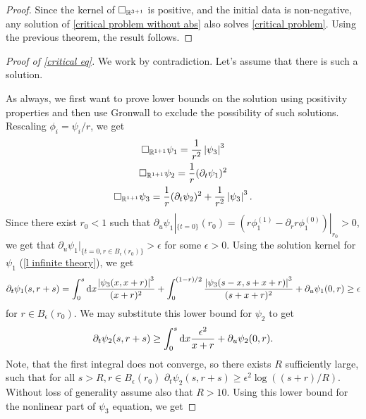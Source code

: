 \documentclass[11pt, oneside]{amsart}
\begin{document}
	\begin{proof}
		Since the kernel of $\Box_{\mathbb{R}^{3+1}}$ is positive, and the initial data is non-negative, any solution of \cref{critical problem without abs} also solves \cref{critical problem}. Using the previous theorem, the result follows.
	\end{proof}
	\begin{proof}[Proof of \cref{critical eq}]
		We work by contradiction. Let's assume that there is such a solution.
		
		As always, we first want to prove lower bounds on the solution using positivity properties and then use Gronwall to exclude the possibility of such solutions. Rescaling $\phi_i=\psi_i/r$, we get
		\begin{equation*}
			\begin{gathered}
				\Box_{\mathbb{R}^{1+1}}\psi_1=\frac{1}{r^2}\left\lvert \psi_3\right\rvert^3\\
				\Box_{\mathbb{R}^{1+1}}\psi_2=\frac{1}{r}(\partial_t\psi_1)^2\\
				\Box_{\mathbb{R}^{1+1}}\psi_3=\frac{1}{r}(\partial_t\psi_2)^2+\frac{1}{r^2}\left\lvert \psi_3\right\rvert^3.
			\end{gathered}
		\end{equation*}		
		Since there exist $r_0<1$ such that $\partial_u\psi_1|_{\{t=0\}}(r_0)=(r\phi^{(1)}_1-\partial_r r\phi^{(0)}_1)|_{r_0}>0$, we get that $\partial_u\psi_1|_{\{t=0,r\in B_\epsilon(r_0)\}}>\epsilon$ for some $\epsilon>0$. Using the solution kernel for $\psi_1$ (\cref{l infinite theory}), we get
		\begin{equation*}
			\begin{gathered}
				\partial_t\psi_1(s,r+s)=\int_{0}^{s}\mathrm{d} x \frac{\left\lvert \psi_3(x,x+r)\right\rvert^3}{(x+r)^2}+\int_{0}^{(1-r)/2}\frac{\left\lvert \psi_3(s-x,s+x+r)\right\rvert^3}{(s+x+r)^2}+\partial_u\psi_1(0,r)\geq\epsilon
			\end{gathered}
		\end{equation*}
		for $r\in B_{\epsilon}(r_0)$. We may substitute this lower bound for $\psi_2$ to get
		\begin{equation*}
			\begin{gathered}
				\partial_t\psi_2(s,r+s)\geq\int_0^s\mathrm{d} x \frac{\epsilon^2}{x+r}+\partial_u\psi_2(0,r).
			\end{gathered}
		\end{equation*}
		Note, that the first integral does not converge, so there exists $R$ sufficiently large, such that for all $s>R,r\in B_\epsilon(r_0)$ $\partial_t\psi_2(s,r+s)\geq \epsilon^2\log((s+r)/R)$. Without loss of generality assume also that $R>10$. Using this lower bound for the nonlinear part of $\psi_3$ equation, we get

\end{proof}
\end{document}
